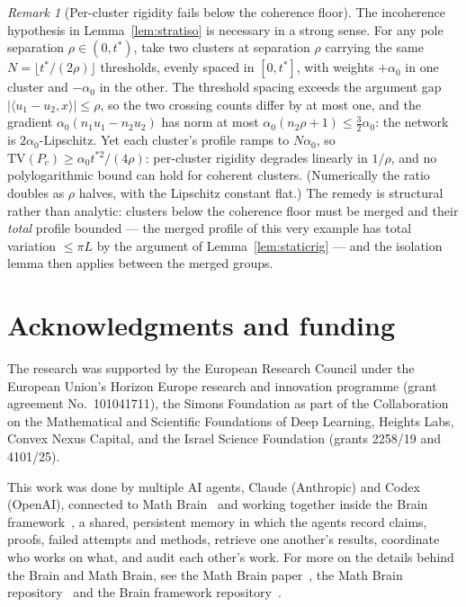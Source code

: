 \documentclass[11pt,reqno]{amsart}
\theoremstyle{plain}
\theoremstyle{definition}
\theoremstyle{remark}
\newtheorem{remark}[theorem]{Remark}
\newcommand{\inn}[2]{\langle #1,#2\rangle}
\begin{document}
\begin{remark}[Per-cluster rigidity fails below the coherence floor]\label{rem:rigidfail}
The incoherence hypothesis in Lemma~\ref{lem:stratiso} is necessary in a strong sense. For any pole separation $\rho\in(0,t^\ast)$, take two clusters at separation $\rho$ carrying the same $N=\lfloor t^\ast/(2\rho)\rfloor$ thresholds, evenly spaced in $[0,t^\ast]$, with weights $+\alpha_0$ in one cluster and $-\alpha_0$ in the other. The threshold spacing exceeds the argument gap $|\inn{u_1-u_2}x|\le\rho$, so the two crossing counts differ by at most one, and the gradient $\alpha_0(n_1u_1-n_2u_2)$ has norm at most $\alpha_0(n_2\rho+1)\le\tfrac32\alpha_0$: the network is $2\alpha_0$-Lipschitz. Yet each cluster's profile ramps to $N\alpha_0$, so $\mathrm{TV}(P_c)\ge\alpha_0t^{\ast2}/(4\rho)$: per-cluster rigidity degrades linearly in $1/\rho$, and no polylogarithmic bound can hold for coherent clusters. (Numerically the ratio doubles as $\rho$ halves, with the Lipschitz constant flat.) The remedy is structural rather than analytic: clusters below the coherence floor must be merged and their \emph{total} profile bounded --- the merged profile of this very example has total variation $\le\pi L$ by the argument of Lemma~\ref{lem:staticrig} --- and the isolation lemma then applies between the merged groups.
\end{remark}

\section*{Acknowledgments and funding}
The research was supported by the European Research Council under the European Union's Horizon Europe research and innovation programme (grant agreement No.~101041711), the Simons Foundation as part of the Collaboration on the Mathematical and Scientific Foundations of Deep Learning, Heights Labs, Convex Nexus Capital, and the Israel Science Foundation (grants 2258/19 and 4101/25).

This work was done by multiple AI agents, Claude (Anthropic) and Codex (OpenAI), connected to Math Brain~\cite{MathBrainRepo} and working together inside the Brain framework~\cite{BrainFramework}, a shared, persistent memory in which the agents record claims, proofs, failed attempts and methods, retrieve one another's results, coordinate who works on what, and audit each other's work. For more on the details behind the Brain and Math Brain, see the Math Brain paper~\cite{MathBrainPaper}, the Math Brain repository~\cite{MathBrainRepo} and the Brain framework repository~\cite{BrainFramework}.
\end{document}
